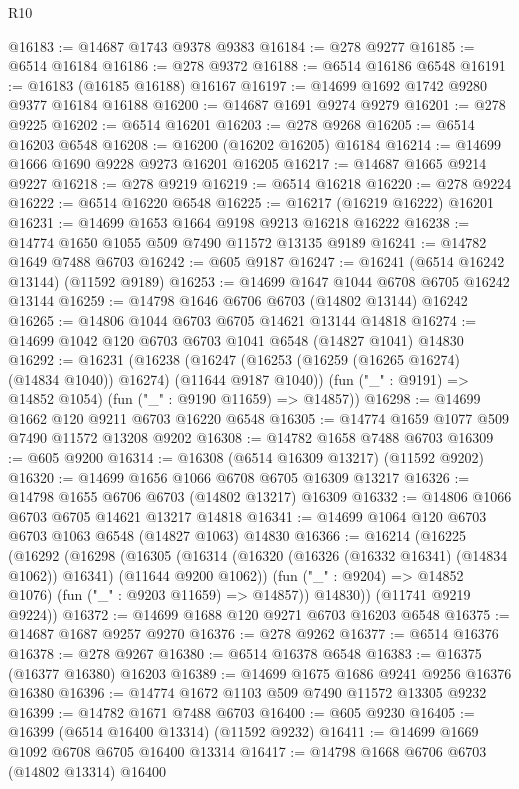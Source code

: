 \begin{lexlean}{R10}
\begin{coremodule}
@16183 := @14687 @1743 @9378 @9383
@16184 := @278 @9277
@16185 := @6514 @16184
@16186 := @278 @9372
@16188 := @6514 @16186 @6548
@16191 := @16183 (@16185 @16188) @16167
@16197 := @14699 @1692 @1742 @9280 @9377 @16184 @16188
@16200 := @14687 @1691 @9274 @9279
@16201 := @278 @9225
@16202 := @6514 @16201
@16203 := @278 @9268
@16205 := @6514 @16203 @6548
@16208 := @16200 (@16202 @16205) @16184
@16214 := @14699 @1666 @1690 @9228 @9273 @16201 @16205
@16217 := @14687 @1665 @9214 @9227
@16218 := @278 @9219
@16219 := @6514 @16218
@16220 := @278 @9224
@16222 := @6514 @16220 @6548
@16225 := @16217 (@16219 @16222) @16201
@16231 := @14699 @1653 @1664 @9198 @9213 @16218 @16222
@16238 := @14774 @1650 @1055 @509 @7490 @11572 @13135 @9189
@16241 := @14782 @1649 @7488 @6703
@16242 := @605 @9187
@16247 := @16241 (@6514 @16242 @13144) (@11592 @9189)
@16253 := @14699 @1647 @1044 @6708 @6705 @16242 @13144
@16259 := @14798 @1646 @6706 @6703 (@14802 @13144) @16242
@16265 := @14806 @1044 @6703 @6705 @14621 @13144 @14818
@16274 := @14699 @1042 @120 @6703 @6703 @1041 @6548 (@14827 @1041) @14830
@16292 := @16231
    (@16238
      (@16247 (@16253 (@16259 (@16265 @16274) (@14834 @1040)) @16274) (@11644 @9187 @1040))
      (fun ("_" : @9191) => @14852 @1054)
      (fun ("_" : @9190 @11659) => @14857))
@16298 := @14699 @1662 @120 @9211 @6703 @16220 @6548
@16305 := @14774 @1659 @1077 @509 @7490 @11572 @13208 @9202
@16308 := @14782 @1658 @7488 @6703
@16309 := @605 @9200
@16314 := @16308 (@6514 @16309 @13217) (@11592 @9202)
@16320 := @14699 @1656 @1066 @6708 @6705 @16309 @13217
@16326 := @14798 @1655 @6706 @6703 (@14802 @13217) @16309
@16332 := @14806 @1066 @6703 @6705 @14621 @13217 @14818
@16341 := @14699 @1064 @120 @6703 @6703 @1063 @6548 (@14827 @1063) @14830
@16366 := @16214
    (@16225
      (@16292
        (@16298
          (@16305
            (@16314 (@16320 (@16326 (@16332 @16341) (@14834 @1062)) @16341) (@11644 @9200 @1062))
            (fun ("_" : @9204) => @14852 @1076)
            (fun ("_" : @9203 @11659) => @14857))
          @14830))
      (@11741 @9219 @9224))
@16372 := @14699 @1688 @120 @9271 @6703 @16203 @6548
@16375 := @14687 @1687 @9257 @9270
@16376 := @278 @9262
@16377 := @6514 @16376
@16378 := @278 @9267
@16380 := @6514 @16378 @6548
@16383 := @16375 (@16377 @16380) @16203
@16389 := @14699 @1675 @1686 @9241 @9256 @16376 @16380
@16396 := @14774 @1672 @1103 @509 @7490 @11572 @13305 @9232
@16399 := @14782 @1671 @7488 @6703
@16400 := @605 @9230
@16405 := @16399 (@6514 @16400 @13314) (@11592 @9232)
@16411 := @14699 @1669 @1092 @6708 @6705 @16400 @13314
@16417 := @14798 @1668 @6706 @6703 (@14802 @13314) @16400

\end{coremodule}
\end{lexlean}
